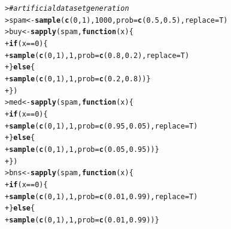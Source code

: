 \documentclass{article}\usepackage[]{graphicx}\usepackage[]{color}
\makeatletter
\newcommand{\hlnum}[1]{\textcolor[rgb]{0.686,0.059,0.569}{#1}}%
\newcommand{\hlcom}[1]{\textcolor[rgb]{0.678,0.584,0.686}{\textit{#1}}}%
\newcommand{\hlopt}[1]{\textcolor[rgb]{0,0,0}{#1}}%
\newcommand{\hlstd}[1]{\textcolor[rgb]{0.345,0.345,0.345}{#1}}%
\newcommand{\hlkwa}[1]{\textcolor[rgb]{0.161,0.373,0.58}{\textbf{#1}}}%
\newcommand{\hlkwb}[1]{\textcolor[rgb]{0.69,0.353,0.396}{#1}}%
\newcommand{\hlkwc}[1]{\textcolor[rgb]{0.333,0.667,0.333}{#1}}%
\newcommand{\hlkwd}[1]{\textcolor[rgb]{0.737,0.353,0.396}{\textbf{#1}}}%
\newenvironment{kframe}{%
 \def\at@end@of@kframe{}%
 \ifinner\ifhmode%
  \def\at@end@of@kframe{\end{minipage}}%
  \begin{minipage}{\columnwidth}%
 \fi\fi%
 \def\FrameCommand##1{\hskip\@totalleftmargin \hskip-\fboxsep
 \colorbox{shadecolor}{##1}\hskip-\fboxsep
     \hskip-\linewidth \hskip-\@totalleftmargin \hskip\columnwidth}%
 \MakeFramed {\advance\hsize-\width
   \@totalleftmargin\z@ \linewidth\hsize
   \@setminipage}}%
 {\par\unskip\endMakeFramed%
 \at@end@of@kframe}
\newenvironment{knitrout}{}{} %
\makeatother
\begin{document}
\begin{knitrout}
\color{fgcolor}\begin{kframe}
\begin{alltt}
\hlstd{> }\hlcom{# artificial dataset generation}
\hlstd{> }\hlstd{spam} \hlkwb{<-} \hlkwd{sample}\hlstd{(}\hlkwd{c}\hlstd{(}\hlnum{0}\hlstd{,}\hlnum{1}\hlstd{),} \hlnum{1000}\hlstd{,} \hlkwc{prob}\hlstd{=}\hlkwd{c}\hlstd{(}\hlnum{0.5}\hlstd{,} \hlnum{0.5}\hlstd{),} \hlkwc{replace}\hlstd{=T)}
\hlstd{> }\hlstd{buy} \hlkwb{<-} \hlkwd{sapply}\hlstd{(spam,} \hlkwa{function}\hlstd{(}\hlkwc{x}\hlstd{) \{}
\hlstd{+ }                        \hlkwa{if} \hlstd{(x} \hlopt{==} \hlnum{0}\hlstd{) \{}
\hlstd{+ }                            \hlkwd{sample}\hlstd{(}\hlkwd{c}\hlstd{(}\hlnum{0}\hlstd{,}\hlnum{1}\hlstd{),}\hlnum{1}\hlstd{,}\hlkwc{prob}\hlstd{=}\hlkwd{c}\hlstd{(}\hlnum{0.8}\hlstd{,}\hlnum{0.2}\hlstd{),}\hlkwc{replace}\hlstd{=T)}
\hlstd{+ }                        \hlstd{\}} \hlkwa{else} \hlstd{\{}
\hlstd{+ }                            \hlkwd{sample}\hlstd{(}\hlkwd{c}\hlstd{(}\hlnum{0}\hlstd{,}\hlnum{1}\hlstd{),}\hlnum{1}\hlstd{,}\hlkwc{prob}\hlstd{=}\hlkwd{c}\hlstd{(}\hlnum{0.2}\hlstd{,}\hlnum{0.8}\hlstd{))\}}
\hlstd{+ }                    \hlstd{\})}
\hlstd{> }\hlstd{med} \hlkwb{<-} \hlkwd{sapply}\hlstd{(spam,} \hlkwa{function}\hlstd{(}\hlkwc{x}\hlstd{) \{}
\hlstd{+ }                        \hlkwa{if} \hlstd{(x} \hlopt{==} \hlnum{0}\hlstd{) \{}
\hlstd{+ }                            \hlkwd{sample}\hlstd{(}\hlkwd{c}\hlstd{(}\hlnum{0}\hlstd{,}\hlnum{1}\hlstd{),}\hlnum{1}\hlstd{,}\hlkwc{prob}\hlstd{=}\hlkwd{c}\hlstd{(}\hlnum{0.95}\hlstd{,}\hlnum{0.05}\hlstd{),}\hlkwc{replace}\hlstd{=T)}
\hlstd{+ }                        \hlstd{\}} \hlkwa{else} \hlstd{\{}
\hlstd{+ }                            \hlkwd{sample}\hlstd{(}\hlkwd{c}\hlstd{(}\hlnum{0}\hlstd{,}\hlnum{1}\hlstd{),}\hlnum{1}\hlstd{,}\hlkwc{prob}\hlstd{=}\hlkwd{c}\hlstd{(}\hlnum{0.05}\hlstd{,}\hlnum{0.95}\hlstd{))\}}
\hlstd{+ }                    \hlstd{\})}
\hlstd{> }\hlstd{bns} \hlkwb{<-} \hlkwd{sapply}\hlstd{(spam,} \hlkwa{function}\hlstd{(}\hlkwc{x}\hlstd{) \{}
\hlstd{+ }                        \hlkwa{if} \hlstd{(x} \hlopt{==} \hlnum{0}\hlstd{) \{}
\hlstd{+ }                            \hlkwd{sample}\hlstd{(}\hlkwd{c}\hlstd{(}\hlnum{0}\hlstd{,}\hlnum{1}\hlstd{),}\hlnum{1}\hlstd{,}\hlkwc{prob}\hlstd{=}\hlkwd{c}\hlstd{(}\hlnum{0.01}\hlstd{,}\hlnum{0.99}\hlstd{),}\hlkwc{replace}\hlstd{=T)}
\hlstd{+ }                        \hlstd{\}} \hlkwa{else} \hlstd{\{}
\hlstd{+ }                            \hlkwd{sample}\hlstd{(}\hlkwd{c}\hlstd{(}\hlnum{0}\hlstd{,}\hlnum{1}\hlstd{),}\hlnum{1}\hlstd{,}\hlkwc{prob}\hlstd{=}\hlkwd{c}\hlstd{(}\hlnum{0.01}\hlstd{,}\hlnum{0.99}\hlstd{))\}}

\end{alltt}
\end{kframe}
\end{knitrout}
\end{document}
